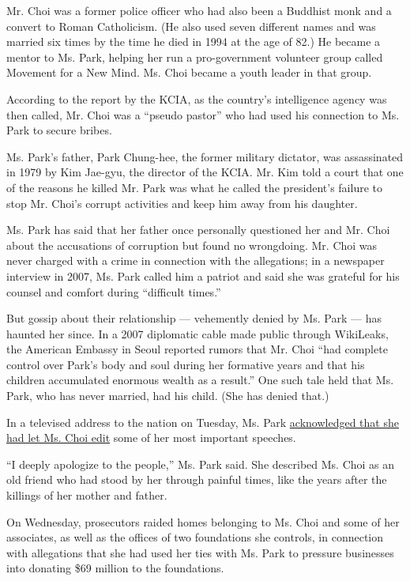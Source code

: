 Mr. Choi was a former police officer who had also been a Buddhist monk
and a convert to Roman Catholicism. (He also used seven different names
and was married six times by the time he died in 1994 at the age of 82.)
He became a mentor to Ms. Park, helping her run a pro-government
volunteer group called Movement for a New Mind. Ms. Choi became a youth
leader in that group.

According to the report by the KCIA, as the country's intelligence
agency was then called, Mr. Choi was a ``pseudo pastor'' who had used
his connection to Ms. Park to secure bribes.

Ms. Park's father, Park Chung-hee, the former military dictator, was
assassinated in 1979 by Kim Jae-gyu, the director of the KCIA. Mr. Kim
told a court that one of the reasons he killed Mr. Park was what he
called the president's failure to stop Mr. Choi's corrupt activities and
keep him away from his daughter.

Ms. Park has said that her father once personally questioned her and Mr.
Choi about the accusations of corruption but found no wrongdoing. Mr.
Choi was never charged with a crime in connection with the allegations;
in a newspaper interview in 2007, Ms. Park called him a patriot and said
she was grateful for his counsel and comfort during ``difficult times.''

But gossip about their relationship --- vehemently denied by Ms. Park
--- has haunted her since. In a 2007 diplomatic cable made public
through WikiLeaks, the American Embassy in Seoul reported rumors that
Mr. Choi ``had complete control over Park's body and soul during her
formative years and that his children accumulated enormous wealth as a
result.'' One such tale held that Ms. Park, who has never married, had
his child. (She has denied that.)

In a televised address to the nation on Tuesday, Ms. Park
\href{http://www.nytimes3xbfgragh.onion/aponline/2016/10/25/world/asia/ap-as-skorea-politics.html}{acknowledged
that she had let Ms. Choi edit} some of her most important speeches.

``I deeply apologize to the people,'' Ms. Park said. She described Ms.
Choi as an old friend who had stood by her through painful times, like
the years after the killings of her mother and father.

On Wednesday, prosecutors raided homes belonging to Ms. Choi and some of
her associates, as well as the offices of two foundations she controls,
in connection with allegations that she had used her ties with Ms. Park
to pressure businesses into donating \$69 million to the foundations.

